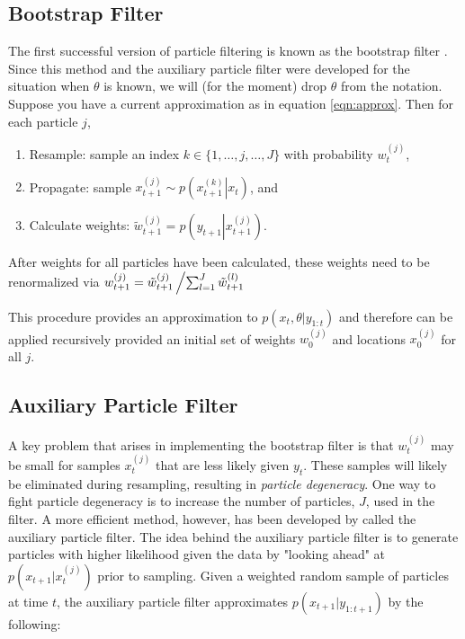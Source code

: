 \documentclass{article}
\begin{document}
\subsection{Bootstrap Filter}

The first successful version of particle filtering is known as the bootstrap filter \citep{Gord:Salm:Smit:nove:1993}. Since this method and the auxiliary particle filter were developed for the situation when $\theta$ is known, we will (for the moment) drop $\theta$ from the notation. Suppose you have a current approximation as in equation \eqref{eqn:approx}. Then for each particle $j$,

\begin{enumerate}
\item Resample: sample an index $k\in \{1,\ldots,j,\ldots,J\}$ with probability $w_t^{(j)}$,
\item Propagate: sample $x_{t+1}^{(j)} \sim p\left(\left. x_{t+1}^{(k)}\right|x_t\right)$, and
\item Calculate weights: $\tilde{w}_{t+1}^{(j)} = p\left(y_{t+1}\left|x_{t+1}^{(j)}\right.\right)$.
\end{enumerate}

\noindent After weights for all particles have been calculated, these weights need to be renormalized via $w_{t+1}^{(j)} = \tilde{w}_{t+1}^{(j)}\left/ \sum_{l=1}^J \tilde{w}_{t+1}^{(l)} \right.$

This procedure provides an approximation to $p(x_t,\theta| y_{1:t})$ and therefore can be applied recursively provided an initial set of weights $w_0^{(j)}$ and locations $x_0^{(j)}$ for all $j$.

\subsection{Auxiliary Particle Filter}

A key problem that arises in implementing the bootstrap filter is that $w_t^{(j)}$ may be small for samples $x_t^{(j)}$ that are less likely given $y_t$. These samples will likely be eliminated during resampling, resulting in \emph{particle degeneracy}. One way to fight particle degeneracy is to increase the number of particles, $J$, used in the filter. A more efficient method, however, has been developed by \citet{Pitt:Shep:filt:1999} called the auxiliary particle filter.  The idea behind the auxiliary particle filter is to generate particles with higher likelihood given the data by "looking ahead" at $p(x_{t+1}|x_t^{(j)})$ prior to sampling. Given a weighted random sample of particles at time $t$, the auxiliary particle filter approximates $p(x_{t+1}|y_{1:t+1})$ by the following:
\end{document}
